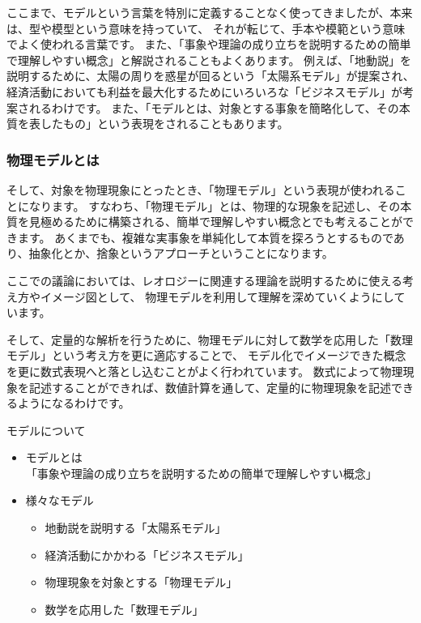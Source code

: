 \documentclass[uplatex,dvipdfmx,a4paper,11pt]{jsreport}
\begin{document}
ここまで、モデルという言葉を特別に定義することなく使ってきましたが、本来は、型や模型という意味を持っていて、
それが転じて、手本や模範という意味でよく使われる言葉です。
また、「事象や理論の成り立ちを説明するための簡単で理解しやすい概念」と解説されることもよくあります。
例えば、「地動説」を説明するために、太陽の周りを惑星が回るという「太陽系モデル」が提案され、
経済活動においても利益を最大化するためにいろいろな「ビジネスモデル」が考案されるわけです。
また、「モデルとは、対象とする事象を簡略化して、その本質を表したもの」という表現をされることもあります。

\subsubsection{物理モデルとは}
そして、対象を物理現象にとったとき、「物理モデル」という表現が使われることになります。
すなわち、「物理モデル」とは、物理的な現象を記述し、その本質を見極めるために構築される、簡単で理解しやすい概念とでも考えることができます。
あくまでも、複雑な実事象を単純化して本質を探ろうとするものであり、抽象化とか、捨象というアプローチということになります。

ここでの議論においては、レオロジーに関連する理論を説明するために使える考え方やイメージ図として、
物理モデルを利用して理解を深めていくようにしています。

そして、定量的な解析を行うために、物理モデルに対して数学を応用した「数理モデル」という考え方を更に適応することで、
モデル化でイメージできた概念を更に数式表現へと落とし込むことがよく行われています。
数式によって物理現象を記述することができれば、数値計算を通して、定量的に物理現象を記述できるようになるわけです。
\large
\begin{itembox}[l]{モデルについて}
	\begin{itemize}
		\item モデルとは\\
		「事象や理論の成り立ちを説明するための簡単で理解しやすい概念」
		\item 様々なモデル
		\begin{itemize}
			\item 地動説を説明する「太陽系モデル」
			\item 経済活動にかかわる「ビジネスモデル」
			\item 物理現象を対象とする「物理モデル」
			\item 数学を応用した「数理モデル」
		\end{itemize}
	\end{itemize}	
\end{itembox}
\normalsize
\end{document}
